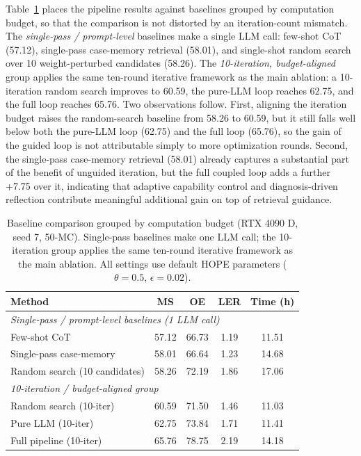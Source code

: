 Table~\ref{tab:baseline-comparison} places the pipeline results against baselines grouped by computation budget, so that the comparison is not distorted by an iteration-count mismatch. The \emph{single-pass / prompt-level} baselines make a single LLM call: few-shot CoT (57.12), single-pass case-memory retrieval (58.01), and single-shot random search over 10 weight-perturbed candidates (58.26). The \emph{10-iteration, budget-aligned} group applies the same ten-round iterative framework as the main ablation: a 10-iteration random search improves to 60.59, the pure-LLM loop reaches 62.75, and the full loop reaches 65.76. Two observations follow. First, aligning the iteration budget raises the random-search baseline from 58.26 to 60.59, but it still falls well below both the pure-LLM loop (62.75) and the full loop (65.76), so the gain of the guided loop is not attributable simply to more optimization rounds. Second, the single-pass case-memory retrieval (58.01) already captures a substantial part of the benefit of unguided iteration, but the full coupled loop adds a further +7.75 over it, indicating that adaptive capability control and diagnosis-driven reflection contribute meaningful additional gain on top of retrieval guidance.

\begin{table}[ht]
\centering
\caption{Baseline comparison grouped by computation budget (RTX 4090 D, seed 7, 50-MC). Single-pass baselines make one LLM call; the 10-iteration group applies the same ten-round iterative framework as the main ablation. All settings use default HOPE parameters ($\theta=0.5$, $\epsilon=0.02$).}
\label{tab:baseline-comparison}
\footnotesize
\setlength{\tabcolsep}{4.5pt}
\begin{tabular}{lcccc}
\toprule
Method & MS & OE & LER & Time (h) \\
\midrule
\multicolumn{5}{l}{\emph{Single-pass / prompt-level baselines (1 LLM call)}} \\
Few-shot CoT & 57.12 & 66.73 & 1.19 & 11.51 \\
Single-pass case-memory & 58.01 & 66.64 & 1.23 & 14.68 \\
Random search (10 candidates) & 58.26 & 72.19 & 1.86 & 17.06 \\
\midrule
\multicolumn{5}{l}{\emph{10-iteration / budget-aligned group}} \\
Random search (10-iter) & 60.59 & 71.50 & 1.46 & 11.03 \\
Pure LLM (10-iter) & 62.75 & 73.84 & 1.71 & 11.41 \\
Full pipeline (10-iter) & 65.76 & 78.75 & 2.19 & 14.18 \\
\bottomrule
\end{tabular}
\end{table}

